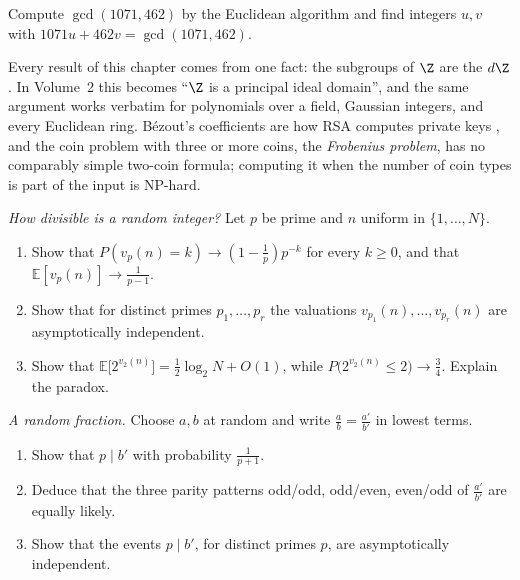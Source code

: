 \begin{exercise}[$\star$]\label{ex:t1-euclid1071}
Compute $\gcd(1071,462)$ by the Euclidean algorithm and find integers $u,v$ with $1071u+462v=\gcd(1071,462)$.
\end{exercise}

\begin{beauty}
Every result of this chapter comes from one fact: the subgroups of $\Z$ are the $d\Z$. In Volume~2 this becomes ``$\Z$ is a principal ideal domain'', and the same argument works verbatim for polynomials over a field, Gaussian integers, and every Euclidean ring. B\'ezout's coefficients are how RSA computes private keys , and the coin problem with three or more coins, the \emph{Frobenius problem}, has no comparably simple two-coin formula; computing it when the number of coin types is part of the input is NP-hard.
\end{beauty}

\begin{exercise}[$\star$]\label{pb:valuation}
\emph{How divisible is a random integer?} Let $p$ be prime and $n$ uniform in $\{1,\dots,N\}$.
\begin{enumerate}[label=(\alph*)]
\item Show that $P(v_p(n)=k)\to(1-\frac1p)p^{-k}$ for every $k\ge0$, and that $\mathbb E[v_p(n)]\to\frac1{p-1}$.
\item Show that for distinct primes $p_1,\dots,p_r$ the valuations $v_{p_1}(n),\dots,v_{p_r}(n)$ are asymptotically independent.
\item Show that $\mathbb E\bigl[2^{v_2(n)}\bigr]=\frac12\log_2N+O(1)$, while $P\bigl(2^{v_2(n)}\le2\bigr)\to\frac34$. Explain the
paradox.
\end{enumerate}
\end{exercise}

\begin{exercise}[$\star$]\label{pb:parity}
\emph{A random fraction.} Choose $a,b$ at random and write $\frac ab=\frac{a'}{b'}$ in lowest terms.
\begin{enumerate}[label=(\alph*)]
\item Show that $p\mid b'$ with probability $\frac1{p+1}$.
\item Deduce that the three parity patterns odd/odd, odd/even, even/odd of $\frac{a'}{b'}$ are equally likely.
\item Show that the events $p\mid b'$, for distinct primes $p$, are asymptotically independent.
\end{enumerate}
\end{exercise}

